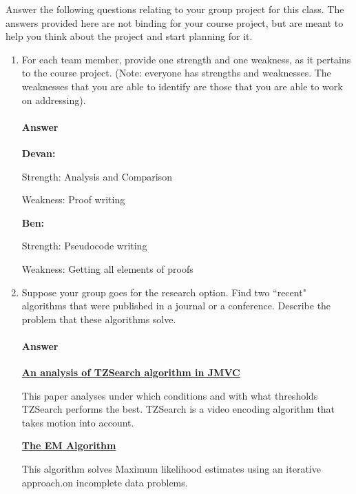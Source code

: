\documentclass{article}
\begin{document}
Answer the following questions relating to your group project for this class.
The answers provided here are not binding for your course project, but are meant
to help you think about the project and start planning for it.

\begin{enumerate}

    \item For each team member, provide one strength and one weakness, as it
        pertains to the course project.  (Note: everyone has strengths and
        weaknesses.  The weaknesses that you are able to identify are those that
        you are able to work on addressing).

        \paragraph{Answer}

{\bf  Devan:}

    Strength: Analysis and Comparison

    Weakness: Proof writing

{\bf  Ben:}

    Strength: Pseudocode writing

    Weakness: Getting all elements of proofs

    \item Suppose your group goes for the research option.  Find two ``recent"
        algorithms that were published in a journal or a conference.  Describe
        the problem that these algorithms solve.

        \paragraph{Answer}

{\bf  \href{https://ieeexplore.ieee.org/abstract/document/5543008?casa_token=D1odCKAaZkgAAAAA:1etG4bLeVzd78znBB9EU5xlRCj7vBHUZOe2n-BKf63L2cwwu9jWJKBNUCLVlcELgTDa0tlIqcYk}{An analysis of TZSearch algorithm in JMVC}}

    This paper analyses under which conditions and with what thresholds TZSearch performs the best. TZSearch is a video encoding algorithm that takes motion into account.

{\bf  \href{https://link.springer.com/chapter/10.1007/978-3-642-21551-3_6}{The EM Algorithm}}

This algorithm solves Maximum likelihood estimates using an iterative approach.on incomplete data problems.


\end{enumerate}
\end{document}

